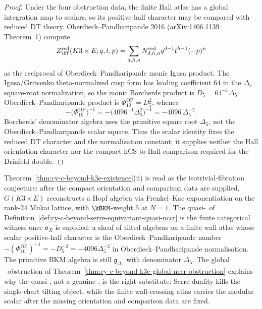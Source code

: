 \begin{proof}
Under the four obstruction data, the finite Hall atlas has a global
integration map to scalars, so its positive-half character may be
compared with reduced DT theory. Oberdieck--Pandharipande 2016
(arXiv:1406.1139 Theorem~1) compute
\[
 Z^{\mathrm{red}}_{\DT}(K3\times E;q,t,p)
 =
 \sum_{d,h,n}N^{\mathrm{red}}_{d,h,n}q^{d-1}t^{h-1}(-p)^n
\]
as the reciprocal of Oberdieck--Pandharipande monic Igusa product. The Igusa/Gritsenko
theta-normalized cusp form has leading coefficient $64$ in the
$\Delta_5$ square-root normalization, so the monic Borcherds product is
$D_5=64^{-1}\Delta_5$. Oberdieck--Pandharipande product is
$\Phi_{10}^{\mathrm{OP}}=D_5^2$, whence
\[
 -\bigl(\Phi_{10}^{\mathrm{OP}}\bigr)^{-1}
 =
 -\bigl(4096^{-1}\Delta_5^2\bigr)^{-1}
 =
 -4096\,\Delta_5^{-2}.
\]
Borcherds' denominator algebra uses the primitive square root
$\Delta_5$, not the Oberdieck--Pandharipande scalar square. Thus the scalar identity fixes
the reduced DT character and the normalization constant; it supplies
neither the Hall orientation character nor the compact hCS-to-Hall
comparison required for the Drinfeld double.
\end{proof}

\begin{remark}
\label{rem:cy-c-beyond-quasi-nccr-and-existence-theorem}
Theorem~\ref{thm:cy-c-beyond-k3e-existence}(ii) is read as the
isotrivial-fibration conjecture: after the compact orientation and
comparison data are supplied, $G(K3 \times E)$ reconstructs a Hopf
algebra via Frenkel--Kac exponentiation on the rank-$24$ Mukai lattice,
with $\kBKM$-weight $5$ at $N = 1$. The
quasi-\NCCR\ of Definition~\ref{def:cy-c-beyond-serre-equivariant-quasi-nccr} is the
finite categorical witness once $\mathfrak o_X$ is supplied: a sheaf
of tilted algebras on a finite wall atlas whose scalar positive-half
character is the Oberdieck--Pandharipande number
$-(\Phi_{10}^{\mathrm{OP}})^{-1}=-D_5^{-2}
=-4096\Delta_5^{-2}$ in Oberdieck--Pandharipande normalisation. The primitive BKM algebra
is still $\mathfrak g_{\Delta_5}$ with denominator $\Delta_5$. The global
\NCCR\ obstruction of
Theorem~\ref{thm:cy-c-beyond-k3e-global-nccr-obstruction} explains why the
quasi-\NCCR, not a genuine \NCCR, is the right substitute: Serre
duality kills the single-chart tilting object, while the finite
wall-crossing atlas carries the modular scalar after the missing
orientation and comparison data are fixed.
\end{remark}

